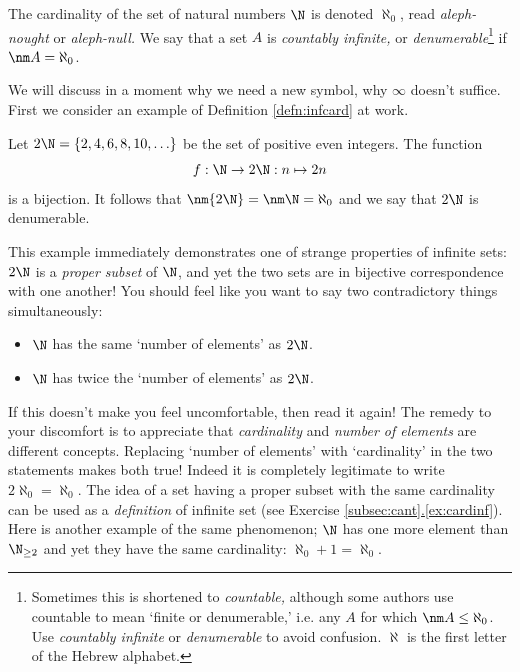 \begin{defn}
The cardinality of the set of natural numbers $\N$ is denoted $\aleph_0$, read \emph{aleph-nought} or \emph{aleph-null.} We say that a set $A$ is \emph{countably infinite,} or \emph{denumerable}\footnote{Sometimes this is shortened to \emph{countable,} although some authors use countable to mean `finite or denumerable,' i.e. any $A$ for which $\nm A\le\aleph_0$. Use \emph{countably infinite} or \emph{denumerable} to avoid confusion. $\aleph$ is the first letter of the Hebrew alphabet.} if $\nm A=\aleph_0$.
\end{defn}

\noindent We will discuss in a moment why we need a new symbol, why $\infty$ doesn't suffice. First we consider an example of Definition \ref{defn:infcard} at work.

\begin{example}
Let $2\N=\{2,4,6,8,10,\ldots\}$ be the set of positive even integers. The function
\[f:\N\to 2\N:n\mapsto 2n\]
is a bijection. It follows that $\nm{2\N}=\nm\N=\aleph_0$ and we say that $2\N$ is denumerable.
\end{example}

\noindent This example immediately demonstrates one of strange properties of infinite sets: $2\N$ is a \emph{proper subset} of $\N$, and yet the two sets are in bijective correspondence with one another! You should feel like you want to say two contradictory things simultaneously:
\begin{itemize}
  \item $\N$ has the same `number of elements' as $2\N$.
  \item $\N$ has twice the `number of elements' as $2\N$.
\end{itemize}
If this doesn't make you feel uncomfortable, then read it again! The remedy to your discomfort is to appreciate that \emph{cardinality} and \emph{number of elements} are different concepts. Replacing `number of elements' with `cardinality' in the two statements makes both true! Indeed it is completely legitimate to write $2\aleph_0=\aleph_0$. The idea of a set having a proper subset with the same cardinality can be used as a \emph{definition} of infinite set (see Exercise \hyperref[ex:cardinf]{\ref*{subsec:cant}.\ref*{ex:cardinf}}).\\

Here is another example of the same phenomenon; $\N$ has one more element than $\N_{\ge 2}$ and yet they have the same cardinality: $\aleph_0+1=\aleph_0$.

